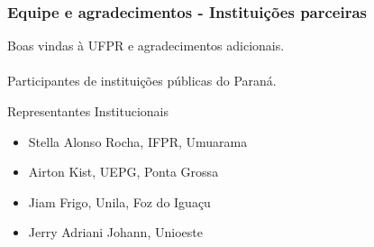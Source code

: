 \documentclass[handout,serif, professionalfont, usenames, dvipsnames, aspectratio = 169]{beamer}\usepackage[]{graphicx}\usepackage[]{color}
\begin{document}
\begin{frame}
  \frametitle{Equipe e agradecimentos - Instituições parceiras}
  Boas vindas à UFPR e agradecimentos adicionais.
  \\ \mbox{} \\
  Participantes de instituições públicas do Paraná.
  
  Representantes Institucionais
  \begin{itemize}
    \itemsep 1ex
  \item Stella Alonso Rocha, IFPR, Umuarama 
  \item Airton Kist, UEPG, Ponta Grossa
  \item Jiam Frigo, Unila, Foz do Iguaçu
  \item Jerry Adriani Johann, Unioeste
  \end{itemize}
 
\end{frame}


  
\end{document}
